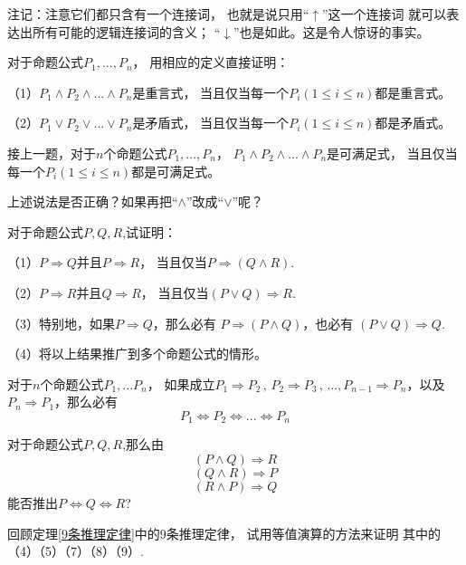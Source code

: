 注记：注意它们都只含有一个连接词，
也就是说只用“$\uparrow$”这一个连接词
就可以表达出所有可能的逻辑连接词的含义；
“$\downarrow$”也是如此。这是令人惊讶的事实。\vs

\begin{prob}对于命题公式$P_1,...,P_n$，
用相应的定义直接证明：

（1）$P_1\wedge P_2\wedge...\wedge P_n$是重言式，
当且仅当每一个$P_i(1\leq i\leq n)$都是重言式。

（2）$P_1\vee P_2\vee...\vee P_n$是矛盾式，
当且仅当每一个$P_i(1\leq i\leq n)$都是矛盾式。
\end{prob}\vs

\begin{prob}接上一题，对于$n$个命题公式$P_1,...,P_n$，
$P_1\wedge P_2\wedge...\wedge P_n$是可满足式，
当且仅当每一个$P_i(1\leq i\leq n)$都是可满足式。

上述说法是否正确？如果再把“$\wedge$”改成“$\vee$”呢？
\end{prob}\vs

\begin{prob}对于命题公式$P,Q,R$,试证明：

（1）$P\Rightarrow Q$并且$P\Rightarrow R$，
当且仅当$P\Rightarrow(Q\wedge R)$.

（2）$P\Rightarrow R$并且$Q\Rightarrow R$，
当且仅当$(P\vee Q)\Rightarrow R$.

（3）特别地，如果$P\Rightarrow Q$，那么必有
$P\Rightarrow(P\wedge Q)$，也必有
$(P\vee Q)\Rightarrow Q$.

（4）将以上结果推广到多个命题公式的情形。
\end{prob}\vs

\begin{prob}[循环论证]
对于$n$个命题公式$P_1,...P_n$，
如果成立$P_1\Rightarrow P_2\,,\,P_2\Rightarrow P_3\,,\,...,
P_{n-1}\Rightarrow P_n$，以及$P_n\Rightarrow P_1$，那么必有
$$P_1\Leftrightarrow P_2
\Leftrightarrow...\Leftrightarrow P_n$$
\end{prob}\vs

\begin{prob}对于命题公式$P,Q,R$,那么由
$$(P\wedge Q)\Rightarrow R$$
$$(Q\wedge R)\Rightarrow P$$
$$(R\wedge P)\Rightarrow Q$$
能否推出$P\Leftrightarrow Q\Leftrightarrow R$?
\end{prob}\vs

\begin{prob}[基本推理定律的验证]
回顾定理\ref{9条推理定律}中的9条推理定律，
试用等值演算的方法来证明
其中的（4）（5）（7）（8）（9）.
\end{prob}\vs

